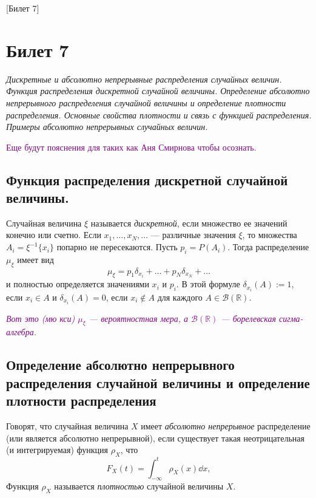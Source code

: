 [Билет 7]

\section{Билет 7}

\begin{center}
    \it Дискретные и абсолютно непрерывные распределения случайных величин.
    Функция распределения дискретной случайной величины.
    Определение абсолютно непрерывного распределения случайной величины и определение плотности распределения.
    Основные свойства плотности и связь с функцией распределения.
    Примеры абсолютно непрерывных случайных величин.

    \textcolor{purple}{Еще будут пояснения для таких как Аня Смирнова чтобы осознать.}
\end{center}

\sectionbreak
\subsection{Функция распределения дискретной случайной величины.}

\begin{definition}
    Случайная величина $\xi$ называется {\it дискретной}, если множество ее значений конечно или счетно.
    Если $x_1, \ldots, x_N, \ldots$ --- различные значения $\xi$, то множества $A_i = \xi^{-1} \{ x_i \}$ попарно не пересекаются.
    Пусть $p_i = P(A_i)$.
    Тогда распределение $\mu_{\xi}$ имеет вид
    \[
        \mu_{\xi} = p_1 \delta_{x_i} + \ldots + p_N \delta_{x_N} + \ldots
    \]
    и полностью определяется значениями $x_i$ и $p_i$.
    В этой формуле $\delta_{x_i}(A) := 1$, если $x_i \in A$ и $\delta_{x_i}(A) = 0$, если $x_i \notin A$ для каждого $A\in \mathcal{B}(\mathbb{R})$.
\end{definition}

\textcolor{purple}{\it Вот это (мю кси) $\mu_{\xi}$ --- вероятностная мера, а $\mathcal{B}(\mathbb{R})$ --- борелевская сигма-алгебра.}

\sectionbreak
\subsection{Определение абсолютно непрерывного распределения случайной величины и определение плотности распределения}

\begin{definition}
    Говорят, что случайная величина $X$ имеет {\it абсолютно непрерывное} распределение (или является абсолютно непрерывной), если существует такая неотрицательная (и интегрируемая) функция $\rho_X$, что
    \[
        F_X(t) = \int_{-\infty}^t \rho_X(x) \dd x,
    \]
    Функция $\rho_X$ называется {\it плотностью} случайной величины $X$.
\end{definition}

